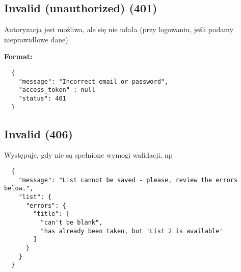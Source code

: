 \subsection{ Invalid (unauthorized) (401)}

Autoryzacja jest możliwa, ale się nie udała (przy logowaniu, jeśli podamy nieprawidłowe dane)

\textbf{Format:}

\begin{lstlisting}
  {
    "message": "Incorrect email or password",
    "access_token" : null
    "status": 401
  }
\end{lstlisting}

\subsection{Invalid (406)}

Występuje, gdy nie są spełnione wymogi walidacji, np

\begin{lstlisting}
  {
    "message": "List cannot be saved - please, review the errors below.",
    "list": {
      "errors": {
        "title": [
          "can't be blank",
          "has already been taken, but 'List 2 is available'
        ]
      }
    }
  }
\end{lstlisting}
